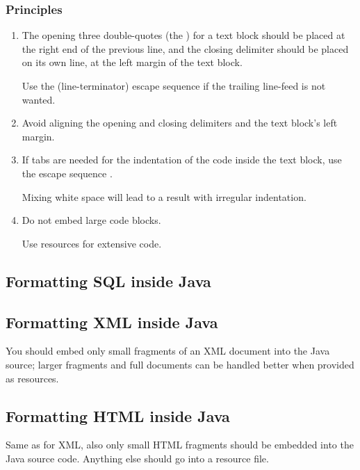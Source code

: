 \subsubsection{Principles}
\begin{enumerate}[label=P\arabic*.]
\item{The opening three double-quotes (the ) for a text block should be placed at the right end of the previous line, and the closing delimiter should be placed on its own line, at the left margin of the text block.

Use the \bdq{\lstinline|\|} (line-terminator) escape sequence if the trailing line-feed is not wanted.}
\item{Avoid aligning the opening and closing delimiters and the text block's left margin.}
\item{If tabs are needed for the indentation of the code inside the text block, use the escape sequence \bdq{\lstinline|\\t|}. 

Mixing white space will lead to a result with irregular indentation.}
\item{Do not embed large code blocks.

Use resources for extensive code.}
\end{enumerate}


\subsection{Formatting SQL inside Java}\label{sec:FormattingSQLInsideJava}


\subsection{Formatting XML inside Java}\label{sec:FormattingXMLInsideJava}
You should embed only small fragments of an XML document into the Java source; larger fragments and full documents can be handled better when provided as resources.


\subsection{Formatting HTML inside Java}\label{sec:FormattingHTMLInsideJava}
Same as for XML, also only small HTML fragments should be embedded into the Java source code. Anything else should go into a resource file.


